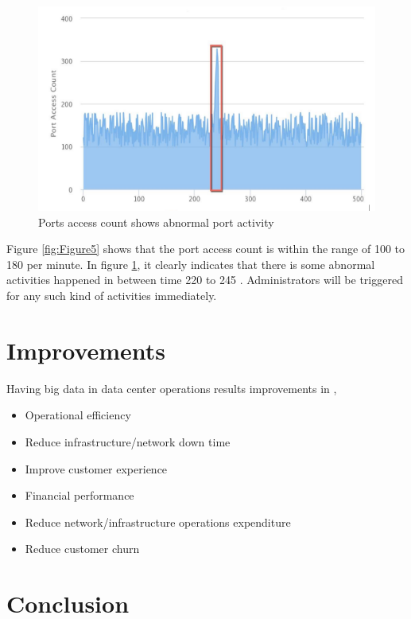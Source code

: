 \documentclass[sigconf]{acmart}
\begin{document}
\begin{figure}[htb]
  \centering
  \includegraphics[width=1.0\columnwidth]{images/Figure6.png}
  \caption{Ports access count shows abnormal port activity
  \cite{streaming-based-network-monitoring-and-threat-detection-system}}
  \label{fig:Figure6} 
\end{figure}

Figure \ref{fig:Figure5} shows that the port access count is within the range of 100 to 180 per minute. In figure \ref{fig:Figure6}, it clearly indicates that there is some abnormal activities happened in between time 220 to 245 \cite{streaming-based-network-monitoring-and-threat-detection-system}. Administrators will be triggered for any such kind of activities immediately. 


\section{Improvements}

Having big data in data center operations results improvements in \cite{datacenter-monitoring-and-analytics-platform},

\begin{itemize}
\item Operational efficiency
\item Reduce infrastructure/network down time
\item Improve customer experience
\item Financial performance
\item Reduce network/infrastructure operations expenditure
\item Reduce customer churn
\end{itemize}


\section{Conclusion}
\end{document}
